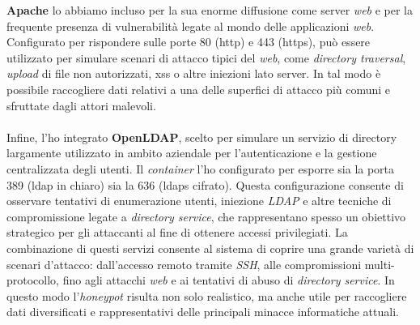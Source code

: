 \textbf{Apache} lo abbiamo incluso per la sua enorme diffusione come server \textit{web} e per la frequente presenza di vulnerabilità legate al mondo delle applicazioni \textit{web}. 
Configurato per rispondere sulle porte 80 (\gls{http}) e 443 (\gls{https}), può essere utilizzato per simulare scenari di attacco tipici del \textit{web}, come \textit{directory traversal}, \textit{upload} di file non autorizzati, \gls{xss} o altre iniezioni lato server. 
In tal modo è possibile raccogliere dati relativi a una delle superfici di attacco più comuni e sfruttate dagli attori malevoli.\\\\
Infine, l'ho integrato \textbf{OpenLDAP}, scelto per simulare un servizio di directory largamente utilizzato in ambito aziendale per l'autenticazione e la gestione centralizzata degli utenti. 
Il \textit{container} l'ho configurato per esporre sia la porta 389 (\gls{ldap} in chiaro) sia la 636 (\gls{ldaps} cifrato). 
Questa configurazione consente di osservare tentativi di enumerazione utenti, iniezione \textit{LDAP} e altre tecniche di compromissione legate a \textit{directory service}, che rappresentano spesso un obiettivo strategico per gli attaccanti al fine di ottenere accessi privilegiati.
La combinazione di questi servizi consente al sistema di coprire una grande varietà di scenari d'attacco: dall'accesso remoto tramite \textit{SSH}, alle compromissioni multi-protocollo, fino agli attacchi \textit{web} e ai tentativi di abuso di \textit{directory service}. 
In questo modo l'\textit{honeypot} risulta non solo realistico, ma anche utile per raccogliere dati diversificati e rappresentativi delle principali minacce informatiche attuali.
